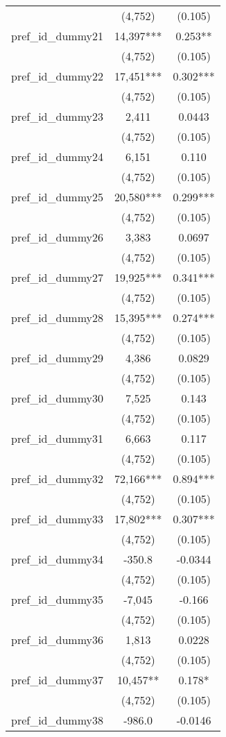 \documentclass[]{article}
\begin{document}
\begin{tabular}{lcc}
 & (4,752) & (0.105) \\
pref\_id\_dummy21 & 14,397*** & 0.253** \\
 & (4,752) & (0.105) \\
pref\_id\_dummy22 & 17,451*** & 0.302*** \\
 & (4,752) & (0.105) \\
pref\_id\_dummy23 & 2,411 & 0.0443 \\
 & (4,752) & (0.105) \\
pref\_id\_dummy24 & 6,151 & 0.110 \\
 & (4,752) & (0.105) \\
pref\_id\_dummy25 & 20,580*** & 0.299*** \\
 & (4,752) & (0.105) \\
pref\_id\_dummy26 & 3,383 & 0.0697 \\
 & (4,752) & (0.105) \\
pref\_id\_dummy27 & 19,925*** & 0.341*** \\
 & (4,752) & (0.105) \\
pref\_id\_dummy28 & 15,395*** & 0.274*** \\
 & (4,752) & (0.105) \\
pref\_id\_dummy29 & 4,386 & 0.0829 \\
 & (4,752) & (0.105) \\
pref\_id\_dummy30 & 7,525 & 0.143 \\
 & (4,752) & (0.105) \\
pref\_id\_dummy31 & 6,663 & 0.117 \\
 & (4,752) & (0.105) \\
pref\_id\_dummy32 & 72,166*** & 0.894*** \\
 & (4,752) & (0.105) \\
pref\_id\_dummy33 & 17,802*** & 0.307*** \\
 & (4,752) & (0.105) \\
pref\_id\_dummy34 & -350.8 & -0.0344 \\
 & (4,752) & (0.105) \\
pref\_id\_dummy35 & -7,045 & -0.166 \\
 & (4,752) & (0.105) \\
pref\_id\_dummy36 & 1,813 & 0.0228 \\
 & (4,752) & (0.105) \\
pref\_id\_dummy37 & 10,457** & 0.178* \\
 & (4,752) & (0.105) \\
pref\_id\_dummy38 & -986.0 & -0.0146 \\

\end{tabular}
\end{document}
